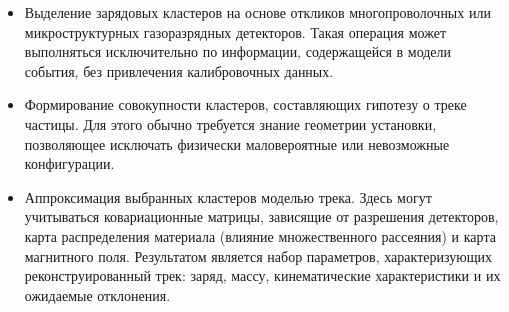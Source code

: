 \begin{itemize}
    \item Выделение зарядовых кластеров на основе откликов многопроволочных или микроструктурных газоразрядных детекторов. Такая операция может выполняться исключительно по информации, содержащейся в модели события, без привлечения калибровочных данных.
    
    \item Формирование совокупности кластеров, составляющих гипотезу о треке частицы. Для этого обычно требуется знание геометрии установки, позволяющее исключать физически маловероятные или невозможные конфигурации.
    
    \item Аппроксимация выбранных кластеров моделью трека. Здесь могут учитываться ковариационные матрицы, зависящие от разрешения детекторов, карта распределения материала (влияние множественного рассеяния) и карта магнитного поля. Результатом является набор параметров, характеризующих реконструированный трек: заряд, массу, кинематические характеристики и их ожидаемые отклонения.
    

\end{itemize}
